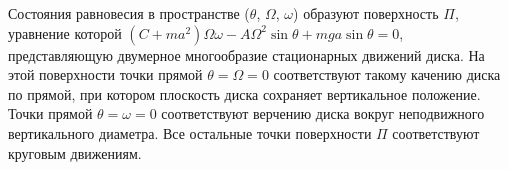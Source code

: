 Состояния равновесия в пространстве ($\theta$, $\Omega$, $\omega$) образуют
поверхность $\Pi$, уравнение которой
$(C + ma^2)\Omega\omega - A\Omega ^2\sin{\theta} + mga\sin{\theta} = 0$,
представляющую двумерное многообразие стационарных движений диска.
На этой поверхности точки прямой $\theta = \Omega = 0$ соответствуют
такому качению диска по прямой, при котором плоскость диска сохраняет
вертикальное положение.
Точки прямой $\theta = \omega = 0$ соответствуют верчению диска вокруг
неподвижного вертикального диаметра.
Все остальные точки поверхности $\Pi$ соответствуют круговым движениям.
